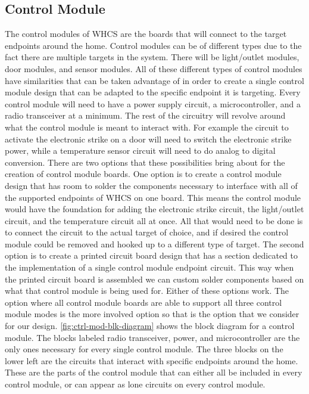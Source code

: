 \subsection{Control Module}
The control modules of WHCS are the boards that will connect to the target
endpoints around the home. Control modules can be of different types due to the
fact there are multiple targets in the system. There will be light/outlet
modules, door modules, and sensor modules. All of these different types of
control modules have similarities that can be taken advantage of in order to
create a single control module design that can be adapted to the specific
endpoint it is targeting. Every control module will need to have a power supply
circuit, a microcontroller, and a radio transceiver at a minimum. The rest of
the circuitry will revolve around what the control module is meant to interact
with. For example the circuit to activate the electronic strike on a door will
need to switch the electronic strike power, while a temperature sensor circuit
will need to do analog to digital conversion. There are two options that these
possibilities bring about for the creation of control module boards. One option
is to create a control module design that has room to solder the components
necessary to interface with all of the supported endpoints of WHCS on one
board. This means the control module would have the foundation for adding the
electronic strike circuit, the light/outlet circuit, and the temperature
circuit all at once. All that would need to be done is to connect the circuit
to the actual target of choice, and if desired the control module could be
removed and hooked up to a different type of target. The second option is to
create a printed circuit board design that has a section dedicated to the
implementation of a single control module endpoint circuit. This way when the
printed circuit board is assembled we can custom solder components based on
what that control module is being used for. Either of these options work. The
option where all control module boards are able to support all three control
module modes is the more involved option so that is the option that we consider
for our design. \autoref{fig:ctrl-mod-blk-diagram} shows the block diagram for a control
module. The blocks labeled radio transceiver, power, and microcontroller are
the only ones necessary for every single control module. The three blocks on
the lower left are the circuits that interact with specific endpoints around
the home. These are the parts of the control module that can either all be
included in every control module, or can appear as lone circuits on every
control module.

